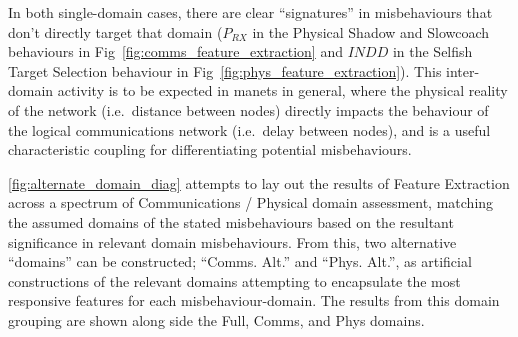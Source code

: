 In both single-domain cases, there are clear ``signatures'' in misbehaviours that don't directly target that domain ($P_{RX}$ in the Physical Shadow and Slowcoach behaviours in Fig~\ref{fig:comms_feature_extraction} and $INDD$ in the Selfish Target Selection behaviour in Fig~\ref{fig:phys_feature_extraction}).
This inter-domain activity is to be expected in \glspl{manet} in general, where the physical reality of the network (i.e.\ distance between nodes) directly impacts the behaviour of the logical communications network (i.e.\ delay between nodes), and is a useful characteristic coupling for differentiating potential misbehaviours.

\autoref{fig:alternate_domain_diag} attempts to lay out the results of Feature Extraction across a spectrum of Communications / Physical domain assessment, matching the assumed domains of the stated misbehaviours based on the resultant significance in relevant domain misbehaviours.
From this, two alternative ``domains'' can be constructed; ``Comms. Alt.'' and ``Phys. Alt.'', as artificial constructions of the relevant domains attempting to encapsulate the most responsive features for each misbehaviour-domain.
The results from this domain grouping are shown along side the Full, Comms, and Phys domains.


